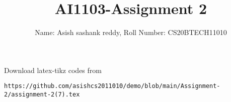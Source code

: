 \documentclass[journal,12pt,twocolumn]{IEEEtran}
\DeclareMathOperator*{\Res}{Res}
\begin{document}
\newcommand{\BEQA}{\begin{eqnarray}}
\newcommand{\EEQA}{\end{eqnarray}}
\newcommand{\define}{\stackrel{\triangle}{=}}

\raggedbottom
\setlength{\parindent}{0pt}
\providecommand{\mbf}{\mathbf}
\providecommand{\pr}[1]{\ensuremath{\Pr\left(#1\right)}}
\providecommand{\qfunc}[1]{\ensuremath{Q\left(#1\right)}}
\providecommand{\sbrak}[1]{\ensuremath{{}\left[#1\right]}}
\providecommand{\lsbrak}[1]{\ensuremath{{}\left[#1\right.}}
\providecommand{\rsbrak}[1]{\ensuremath{{}\left.#1\right]}}
\providecommand{\brak}[1]{\ensuremath{\left(#1\right)}}
\providecommand{\lbrak}[1]{\ensuremath{\left(#1\right.}}
\providecommand{\rbrak}[1]{\ensuremath{\left.#1\right)}}
\providecommand{\cbrak}[1]{\ensuremath{\left\{#1\right\}}}
\providecommand{\lcbrak}[1]{\ensuremath{\left\{#1\right.}}
\providecommand{\rcbrak}[1]{\ensuremath{\left.#1\right\}}}
\theoremstyle{remark}
\newtheorem{rem}{Remark}
\newcommand{\sgn}{\mathop{\mathrm{sgn}}}
\providecommand{\abs}[1]{\vert#1\vert}
\providecommand{\res}[1]{\Res\displaylimits_{#1}} 
\providecommand{\norm}[1]{\lVert#1\rVert}
\providecommand{\mtx}[1]{\mathbf{#1}}
\providecommand{\mean}[1]{E[ #1 ]}
\providecommand{\fourier}{\overset{\mathcal{F}}{ \rightleftharpoons}}
\providecommand{\system}{\overset{\mathcal{H}}{ \longleftrightarrow}}
\newcommand{\solution}{\noindent \textbf{Solution: }}
\newcommand{\cosec}{\,\text{cosec}\,}
\providecommand{\dec}[2]{\ensuremath{\overset{#1}{\underset{#2}{\gtrless}}}}
\newcommand{\myvec}[1]{\ensuremath{\begin{pmatrix}#1\end{pmatrix}}}
\newcommand{\mydet}[1]{\ensuremath{\begin{vmatrix}#1\end{vmatrix}}}
\makeatletter
{}
\makeatother
\let\StandardTheFigure\thefigure
\let\vec\mathbf
\renewcommand{\thefigure}{\theproblem}
\def\putbox#1#2#3{\makebox[0in][l]{\makebox[#1][l]{}\raisebox{\baselineskip}[0in][0in]{\raisebox{#2}[0in][0in]{#3}}}}
     \def\rightbox#1{\makebox[0in][r]{#1}}
     \def\centbox#1{\makebox[0in]{#1}}
     \def\topbox#1{\raisebox{-\baselineskip}[0in][0in]{#1}}
     \def\midbox#1{\raisebox{-0.5\baselineskip}[0in][0in]{#1}}
\vspace{3cm}
\title{AI1103-Assignment 2}
\author{Name: Asish sashank reddy, Roll Number: CS20BTECH11010}
\maketitle
\newpage
\bigskip
\renewcommand{\thefigure}{\theenumi}
\renewcommand{\thetable}{\theenumi}
Download latex-tikz codes from 
%
\begin{lstlisting}
https://github.com/asishcs2011010/demo/blob/main/Assignment-2/assignment-2(7).tex
\end{lstlisting}
\end{document}
